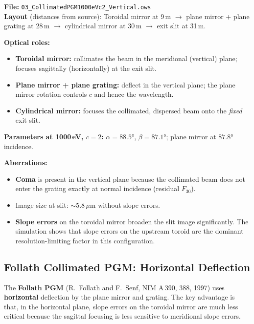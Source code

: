\documentclass[12pt,a4paper]{article}
\newcommand{\al}{\alpha}
\newcommand{\be}{\beta}
\begin{document}
\begin{exbox}
\textbf{File:} \texttt{03\_CollimatedPGM1000eVc2\_Vertical.ows}\\[4pt]
\textbf{Layout} (distances from source): Toroidal mirror at 9\,m $\to$ plane mirror +
plane grating at 28\,m $\to$ cylindrical mirror at 30\,m $\to$ exit slit at 31\,m.

\medskip
\textbf{Optical roles:}
\begin{itemize}
  \item \textbf{Toroidal mirror:} collimates the beam in the meridional (vertical) plane;
        focuses sagittally (horizontally) at the exit slit.
  \item \textbf{Plane mirror + plane grating:} deflect in the vertical plane; the plane
        mirror rotation controls $c$ and hence the wavelength.
  \item \textbf{Cylindrical mirror:} focuses the collimated, dispersed beam onto the
        \emph{fixed} exit slit.
\end{itemize}

\medskip
\textbf{Parameters at 1000\,eV, $c = 2$:} $\al = 88.5°$, $\be = 87.1°$; plane mirror at
$87.8°$ incidence.

\medskip
\textbf{Aberrations:}
\begin{itemize}
  \item \textbf{Coma} is present in the vertical plane because the collimated beam does
        not enter the grating exactly at normal incidence (residual $F_{30}$).
  \item Image size at slit: $\sim 5.8\,\mu$m without slope errors.
  \item \textbf{Slope errors} on the toroidal mirror broaden the slit image significantly.
        The simulation shows that slope errors on the upstream toroid are the dominant
        resolution-limiting factor in this configuration.
\end{itemize}
\end{exbox}

\subsection{Follath Collimated PGM: Horizontal Deflection}

The \textbf{Follath PGM} (R.\ Follath and F.\ Senf, NIM A\,390, 388, 1997) uses
\textbf{horizontal} deflection by the plane mirror and grating.  The key advantage is
that, in the horizontal plane, slope errors on the toroidal mirror are much less critical
because the sagittal focusing is less sensitive to meridional slope errors.
\end{document}

